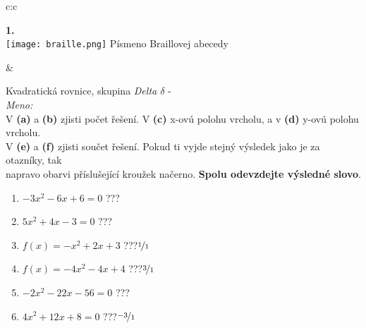 \documentclass[10pt]{report}
\begin{document}
\begin{tabular}{c:c}
\begin{minipage}[c][99mm][t]{0.49\linewidth}
\begin{center}
\begin{minipage}{0.20\linewidth}
\begin{center}
{\Huge\bfseries 1.} \\[2mm]
\texttt{[image: braille.png]}
{\small Písmeno Braillovej abecedy}
\end{center}
\end{minipage}
\end{center}
\end{minipage}
&
\begin{minipage}[c][99mm][t]{0.49\linewidth}
\begin{center}
\vspace{7mm}
{\huge Kvadratická rovnice, skupina \textit{Delta $\delta$} -}\\[4.5mm]
\textit{Meno:}\phantom{xxxxxxxxxxxxxxxxxxxxxxxxxxxxxxxxxxxxxxxxxxxxxxxxxxxxxxxxxxxxxxxxx}\\[3.5mm]
V \textbf{(a)} a \textbf{(b)} zjisti počet řešení. V \textbf{(c)} x-ovú polohu vrcholu, a v \textbf{(d)} y-ovú polohu vrcholu.\\V \textbf{(e)} a \textbf{(f)} zjisti součet řešení. Pokud ti vyjde stejný výsledek jako je za otazníky, tak\\napravo obarvi příslušející kroužek načerno. \textbf{Spolu odevzdejte výsledné slovo}.\\[3mm]
\begin{minipage}{0.77\linewidth}
\begin{center}
\begin{varwidth}{\textwidth}
\begin{enumerate}
\large
\item $-3x^2-6x+6=0$\quad \dotfill\; ???\;\dotfill {}
\item $5x^2+4x-3=0$\quad \dotfill\; ???\;\dotfill {}
\item $f(x)=-x^2+2x+3$\quad \dotfill\; ???\;\dotfill \quad $\nicefrac{1}{1}$
\item $f(x)=-4x^2-4x+4$\quad \dotfill\; ???\;\dotfill \quad $\nicefrac{3}{1}$
\item $-2x^2-22x-56=0$\quad \dotfill\; ???\;\dotfill {}
\item $4x^2+12x+8=0$\quad \dotfill\; ???\;\dotfill \quad $\nicefrac{-3}{1}$
\end{enumerate}
\end{varwidth}
\end{center}
\end{minipage}
\begin{minipage}{0.20\linewidth}

\end{minipage}
\end{center}
\end{minipage}
\end{tabular}
\end{document}
